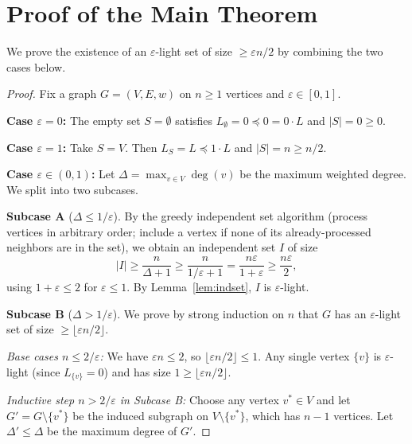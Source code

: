 \documentclass[12pt]{article}
\theoremstyle{definition}
\begin{document}
\section{Proof of the Main Theorem}

We prove the existence of an $\varepsilon$-light set of size $\geq \varepsilon n/2$ by combining the two cases below.

\begin{proof}
Fix a graph $G = (V,E,w)$ on $n \geq 1$ vertices and $\varepsilon \in [0,1]$.

\textbf{Case $\varepsilon = 0$:} The empty set $S = \emptyset$ satisfies $L_\emptyset = 0 \preceq 0 = 0 \cdot L$ and $|S| = 0 \geq 0$.

\textbf{Case $\varepsilon = 1$:} Take $S = V$. Then $L_S = L \preceq 1 \cdot L$ and $|S| = n \geq n/2$.

\textbf{Case $\varepsilon \in (0,1)$:} Let $\Delta = \max_{v \in V} \deg(v)$ be the maximum weighted degree. We split into two subcases.

\medskip
\textbf{Subcase A} ($\Delta \leq 1/\varepsilon$). By the greedy independent set algorithm (process vertices in arbitrary order; include a vertex if none of its already-processed neighbors are in the set), we obtain an independent set $I$ of size
\[
|I| \geq \frac{n}{\Delta + 1} \geq \frac{n}{1/\varepsilon + 1} = \frac{n\varepsilon}{1 + \varepsilon} \geq \frac{n\varepsilon}{2},
\]
using $1 + \varepsilon \leq 2$ for $\varepsilon \leq 1$. By Lemma~\ref{lem:indset}, $I$ is $\varepsilon$-light.

\medskip
\textbf{Subcase B} ($\Delta > 1/\varepsilon$). We prove by strong induction on $n$ that $G$ has an $\varepsilon$-light set of size $\geq \lfloor \varepsilon n/2 \rfloor$.

\emph{Base cases $n \leq 2/\varepsilon$:} We have $\varepsilon n \leq 2$, so $\lfloor \varepsilon n/2 \rfloor \leq 1$. Any single vertex $\{v\}$ is $\varepsilon$-light (since $L_{\{v\}} = 0$) and has size $1 \geq \lfloor \varepsilon n/2\rfloor$.

\emph{Inductive step $n > 2/\varepsilon$ in Subcase B:} Choose any vertex $v^* \in V$ and let $G' = G \setminus \{v^*\}$ be the induced subgraph on $V \setminus \{v^*\}$, which has $n - 1$ vertices. Let $\Delta' \leq \Delta$ be the maximum degree of $G'$.


\end{proof}
\end{document}
